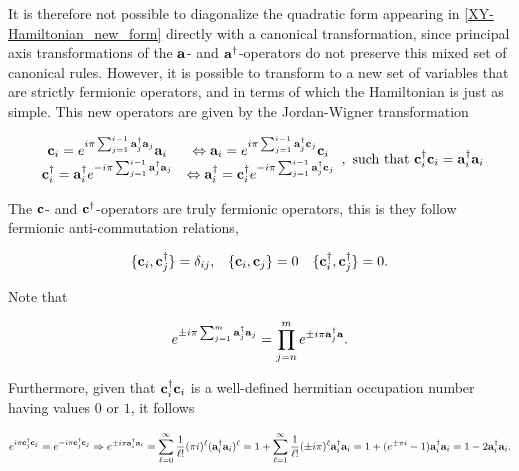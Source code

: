 \documentclass{homework}
\begin{document}
It is therefore not possible to diagonalize the quadratic form appearing in \cref{XY-Hamiltonian_new_form} directly with a canonical transformation, since principal axis transformations of the ${\bf a}$- and ${\bf a}^\dagger$-operators do not preserve this mixed set of canonical rules. However, it is possible to transform to a new set of variables that are strictly fermionic operators, and in terms of which the Hamiltonian is just as simple. This new operators are given by the Jordan-Wigner transformation

\begin{equation}
    \begin{array}{cc}
         {\bf c}_i = e^{i\pi \sum_{j=1}^{i-1} {\bf a}_j^\dagger {\bf a}_j} {\bf a}_i & \Leftrightarrow {\bf a}_i = e^{i\pi \sum_{j=1}^{i-1} {\bf a}_j^\dagger {\bf c}_j} {\bf c}_i \\
         {\bf c}_i^\dagger = {\bf a}_i^\dagger e^{-i\pi \sum_{j=1}^{i-1} {\bf a}_j^\dagger {\bf a}_j} & \Leftrightarrow {\bf a}_i^\dagger = {\bf c}_i^\dagger e^{-i\pi \sum_{j=1}^{i-1} {\bf a}_j^\dagger {\bf c}_j}
    \end{array}, \textnormal{ such that } {\bf c}_i^\dagger {\bf c}_i = {\bf a}_i^\dagger {\bf a}_i 
\end{equation}

The ${\bf c}$- and ${\bf c}^\dagger$-operators are truly fermionic operators, this is they follow fermionic anti-commutation relations, 

\begin{align}
    \{{\bf c}_i, {\bf c}_j^\dagger\} &= \delta_{ij}, & \{{\bf c}_i, {\bf c}_j\} &= 0 & \{{\bf c}_i^\dagger, {\bf c}_j^\dagger\} = 0. 
\end{align}

Note that 

\begin{equation}
    e^{\pm i \pi \sum_{j = 1}^{m} {\bf a}_j^\dagger {\bf a}_j} = \prod_{j=n}^{m} e^{\pm i \pi {\bf a}_j^\dagger {\bf a}}. 
\end{equation}

Furthermore, given that ${\bf c}_i^\dagger {\bf c}_i$ is a well-defined hermitian occupation number having values $0$ or $1$, it follows 

\begin{equation}
\begin{split}
    &e^{i\pi {\bf c}_j^\dagger {\bf c}_j} =  e^{-i\pi {\bf c}_j^\dagger {\bf c}_j} \Rightarrow e^{\pm i \pi {\bf a}_i^\dagger {\bf a}_i} = \sum_{\ell = 0}^{\infty} \frac{1}{\ell!} (\pi i)^\ell ({\bf a}_i^\dagger {\bf a}_i)^\ell = 1 + \sum_{\ell = 1}^\infty \frac{1}{\ell!} (\pm i\pi)^\ell {\bf a}_i^\dagger {\bf a}_i = 1 + (e^{\pm \pi i} - 1) {\bf a}_i^\dagger {\bf a}_i = 1 - 2{\bf a}_i^\dagger {\bf a}_i. \\
\end{split}
\end{equation}
\end{document}

